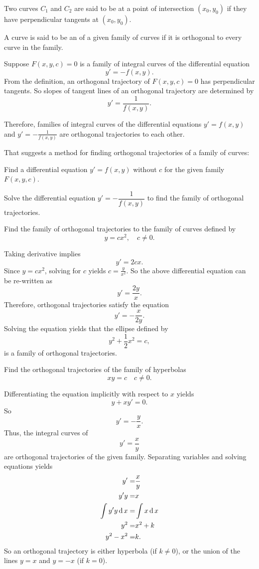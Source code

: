 Two curves $C_1$ and $C_2$ are said to be  at a point of intersection $(x_0,y_0)$ if they have perpendicular tangents at $(x_0,y_0)$. 

A curve is said to be an  of a given family of curves if it is orthogonal to every curve in the family.

Suppose $F(x, y, c)=0$ is a family of integral curves of the differential equation
\[y'=-f(x,y).\]
From the definition, an orthogonal trajectory of $F(x, y, c)=0$ has perpendicular tangents. So slopes of tangent lines of an orthogonal trajectory are determined by 
\[y'=\frac{1}{f(x,y)}.\]

Therefore, families of integral curves of the differential equations $y'=f(x, y)$ and $y'=-\frac{1}{f(x, y)}$ are orthogonal trajectories to each other.

That suggests a method for finding orthogonal trajectories of a family of curves:
\begin{steps}
  \item Find a differential equation $y'=f(x,y)$ without $c$ for the given family $F(x, y, c)$.
  \item Solve the differential equation $y'=-\dfrac{1}{f(x,y)}$ to find the family of orthogonal trajectories.
\end{steps}

\begin{example}
  Find the family of orthogonal trajectories to the family of curves defined by
  \[y=cx^2, \quad c\ne0.\]
\end{example}
\begin{solution}
  Taking derivative implies
  \[y'=2cx.\]
  Since $y=cx^2$, solving for $c$ yields $c=\frac{y}{x^2}$. 
  So the above differential equation can be re-written as
  \[y'=\frac{2y}{x}.\]
  Therefore, orthogonal trajectories satisfy the equation
  \[y'=-\frac{x}{2y}.\]
  Solving the equation yields that the ellipse defined by
  \[y^2+\frac{1}{2}x^2=c,\]
  is a family of orthogonal trajectories.
\end{solution}

\begin{exercise}
  Find the orthogonal trajectories of the family of hyperbolas
\[xy=c \quad c\ne0.\]
\end{exercise}
\begin{exersol}
Differentiating the equation implicitly with respect to $x$ yields
\[y+xy'=0.\]
So
\[y'=-\frac{y}{x}.\]
Thus, the integral curves of
\[y'=\frac{x}{y}\]
are orthogonal trajectories of the given family. Separating variables and solving equations yields
\[
\begin{aligned}
  y'=&\frac{x}{y}\\
  y'y=&x\\
  \int y'y\operatorname{d} x=&\int x\operatorname{d} x\\
  y^2=&x^2+k\\
  y^2-x^2=&k.
\end{aligned}  
\]
So an orthogonal trajectory is either hyperbola (if $k \ne0$), or the union of the lines $y=x$ and $y=-x$ (if $k=0$).
\end{exersol}

